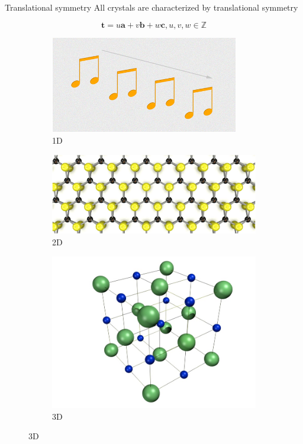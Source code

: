 \documentclass[aspectratio=169]{beamer}
\let \vec \mathbf
\begin{document}
\begin{frame}{Translational symmetry}
All crystals are characterized by translational symmetry

\begin{equation*}
    \vec{t} = u \vec{a} + v \vec{b} + w \vec{c}, u, v, w \in \mathbb{Z}
\end{equation*}

\begin{figure}
    \centering
    \begin{subfigure}{0.25\textwidth}
        \includegraphics[width=\linewidth]{lectures/figures/7_1D_crystal.png}
    \caption{1D}
    \end{subfigure}
    \begin{subfigure}{0.4\textwidth}
        \includegraphics[width=\linewidth]{lectures/figures/7_2D_crystal.png}
    \caption{2D}
    \end{subfigure}
        \begin{subfigure}{0.25\textwidth}
        \includegraphics[width=\linewidth]{lectures/figures/7_3D_crystal.png}
    \caption{3D}
    \end{subfigure}
\end{figure}


\end{frame}
\end{document}
